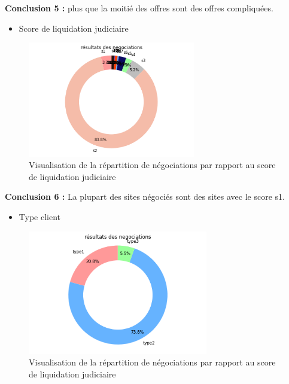 \documentclass[12pt]{article}
\begin{document}
{%
{\bf Conclusion 5 :} plus que la moitié des offres sont des offres compliquées.

\begin{itemize}
\item Score de liquidation judiciaire 
\end{itemize}


\begin{figure}[H]
	\centering
    \includegraphics[width=0.65\textwidth]{image30.png}
     \caption{ Visualisation de la répartition de négociations par rapport au score de liquidation judiciaire}
    \label{fig:30}
\end{figure}

{\bf Conclusion 6 :} La plupart des sites négociés sont des sites avec le score s1.

\begin{itemize}
\item Type client
\end{itemize}


\begin{figure}[H]
	\centering
    \includegraphics[width=0.7\textwidth]{image31.png}
     \caption{ Visualisation de la répartition de négociations par rapport au score de liquidation judiciaire}
    \label{fig:31}
\end{figure}

}
\end{document}
